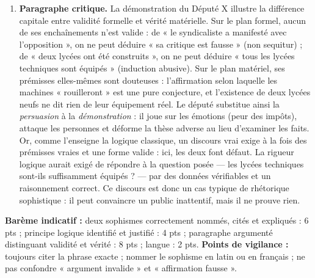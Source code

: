\documentclass[11pt]{article}
\begin{document}
\begin{corrige}
\begin{enumerate}
    \item \textbf{Paragraphe critique.} La démonstration du Député X illustre la différence capitale entre validité formelle et vérité matérielle. Sur le plan formel, aucun de ses enchaînements n'est valide : de « le syndicaliste a manifesté avec l'opposition », on ne peut déduire « sa critique est fausse » (non sequitur) ; de « deux lycées ont été construits », on ne peut déduire « tous les lycées techniques sont équipés » (induction abusive). Sur le plan matériel, ses prémisses elles-mêmes sont douteuses : l'affirmation selon laquelle les machines « rouilleront » est une pure conjecture, et l'existence de deux lycées neufs ne dit rien de leur équipement réel. Le député substitue ainsi la \emph{persuasion} à la \emph{démonstration} : il joue sur les émotions (peur des impôts), attaque les personnes et déforme la thèse adverse au lieu d'examiner les faits. Or, comme l'enseigne la logique classique, un discours vrai exige à la fois des prémisses vraies et une forme valide : ici, les deux font défaut. La rigueur logique aurait exigé de répondre à la question posée — les lycées techniques sont-ils suffisamment équipés ? — par des données vérifiables et un raisonnement correct. Ce discours est donc un cas typique de rhétorique sophistique : il peut convaincre un public inattentif, mais il ne prouve rien.
\end{enumerate}
\textbf{Barème indicatif :} deux sophismes correctement nommés, cités et expliqués : 6 pts ; principe logique identifié et justifié : 4 pts ; paragraphe argumenté distinguant validité et vérité : 8 pts ; langue : 2 pts. \textbf{Points de vigilance :} toujours citer la phrase exacte ; nommer le sophisme en latin ou en français ; ne pas confondre « argument invalide » et « affirmation fausse ».
\end{corrige}
\end{document}
